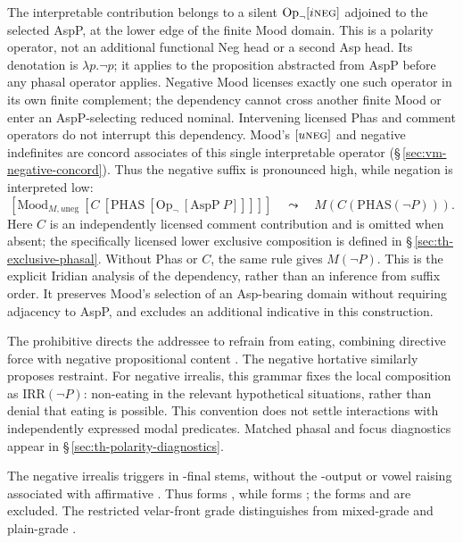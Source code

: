 The interpretable contribution belongs to a silent
$\mathrm{Op}_{\neg}[i\textsc{neg}]$ adjoined to the selected AspP, at the
lower edge of the finite Mood domain. This is a polarity operator, not an
additional functional Neg head or a second Asp head. Its denotation is
$\lambda p.\neg p$; it applies to the proposition abstracted from AspP
before any phasal operator applies. Negative Mood licenses exactly one such
operator in its own finite complement; the dependency cannot cross another
finite Mood or enter an AspP-selecting reduced nominal. Intervening licensed
Phas and comment operators do not interrupt this dependency. Mood's
$[u\textsc{neg}]$ and negative indefinites are concord associates of this
single interpretable operator (§\,\ref{sec:vm-negative-concord}). Thus the
negative suffix is pronounced high, while negation is interpreted low:
\[
 [\mathrm{Mood}_{M,u\mathrm{neg}}\ [C\ [\mathrm{PHAS}\
   [\mathrm{Op}_{\neg}\ [\mathrm{AspP}\ P]]]]]
 \quad\leadsto\quad M(C(\mathrm{PHAS}(\neg P))).
\]
Here $C$ is an independently licensed comment contribution and is omitted
when absent; the specifically licensed lower exclusive composition is defined
in §\,\ref{sec:th-exclusive-phasal}. Without Phas or $C$, the same rule gives
$M(\neg P)$. This is the explicit Iridian analysis of the dependency, rather
than an inference from suffix order. It preserves Mood's selection of an
Asp-bearing domain without requiring adjacency to AspP, and excludes an
additional indicative \ird{za-} in this construction.

The prohibitive   directs the
addressee to refrain from eating, combining directive force with negative
propositional content \cite{han2001}. The negative hortative similarly
proposes restraint. For negative irrealis, this grammar fixes the local
composition as $\mathrm{IRR}(\neg P)$: non-eating in the relevant hypothetical
situations, rather than denial that eating is possible. This convention does
not settle interactions with independently expressed modal predicates.
Matched phasal and focus diagnostics appear in
§\,\ref{sec:th-polarity-diagnostics}.

The negative irrealis  triggers  in
\ird{k}-final stems, without the \ird{č}-output or vowel raising associated
with affirmative \ird{-ěv}. Thus \ird{zděk-} \trsl{bring} forms
, while  forms ; the forms
\ird{*zděkir} and \ird{*zďíčir} are excluded. The restricted velar-front
grade distinguishes \ird{-ir} from mixed-grade \ird{-ěv} and plain-grade
\ird{-ic}.


